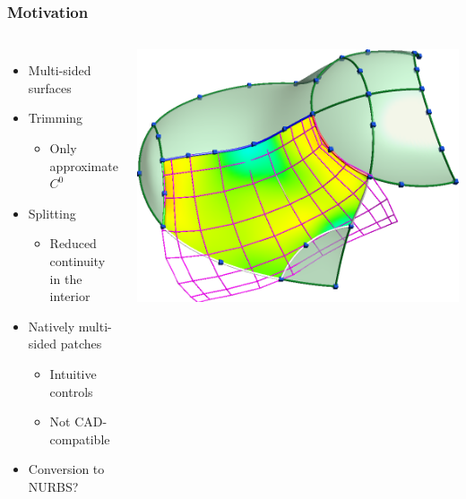 \documentclass[xcolor=table]{beamer}
\begin{document}
\begin{frame}
  \frametitle{Motivation}
  \begin{columns}
    \begin{itemize}
    \item Multi-sided surfaces
    \item Trimming
      \begin{itemize}
      \item Only approximate $C^0$
      \end{itemize}
    \item Splitting
      \begin{itemize}
      \item Reduced continuity\\in the interior
      \end{itemize}
    \item Natively multi-sided patches
      \begin{itemize}
      \item Intuitive controls
      \item Not CAD-compatible
      \end{itemize}
    \item Conversion to NURBS?
    \end{itemize}
    \centering
    \includegraphics[height=.4\textheight]{images/slides/trim.png}\\

\end{columns}
\end{frame}
\end{document}
